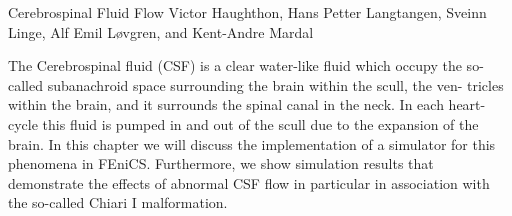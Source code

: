               {Cerebrospinal Fluid Flow}
              {Victor Haughthon, Hans Petter Langtangen, Sveinn Linge, Alf Emil Løvgren, and Kent-Andre Mardal}

\editornote{[haughton]}

The Cerebrospinal fluid (CSF) is a clear water-like fluid which occupy
the so-called subanachroid space surrounding the brain within the
scull, the ven- tricles within the brain, and it surrounds the spinal
canal in the neck. In each heart-cycle this fluid is pumped in and out
of the scull due to the expansion of the brain. In this chapter we
will discuss the implementation of a simulator for this phenomena in
FEniCS. Furthermore, we show simulation results that demonstrate the
effects of abnormal CSF flow in particular in association with the
so-called Chiari I malformation.
